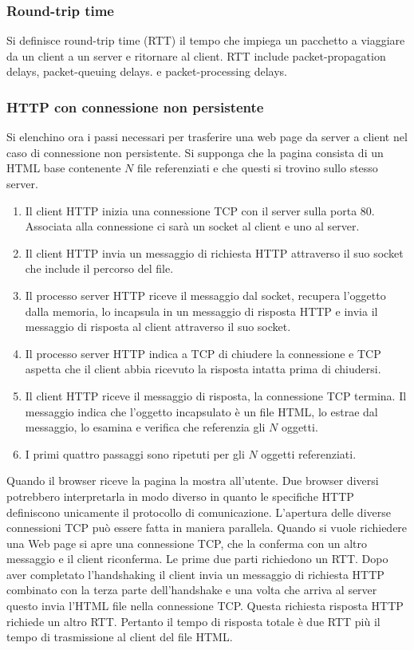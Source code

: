 \subsubsection{Round-trip time}
 Si definisce round-trip time (RTT) il tempo che impiega un pacchetto a viaggiare da un client a un server e ritornare al client. RTT include packet-propagation delays, packet-queuing delays. e packet-processing 
 delays. 
\subsubsection{HTTP con connessione non persistente}
Si elenchino ora i passi necessari per trasferire una web page da server a client nel caso di connessione non persistente. Si supponga che la pagina consista di un HTML base contenente $N$ file referenziati e 
che questi si trovino sullo stesso server.
\begin{enumerate}
\item Il client HTTP inizia una connessione TCP con il server sulla porta $80$. Associata alla connessione ci sar\`a un socket al client e uno al server.
\item Il client HTTP invia un messaggio di richiesta HTTP attraverso il suo socket che include il percorso del file.
\item Il processo server HTTP riceve il messaggio dal socket, recupera l'oggetto dalla memoria, lo incapsula in un messaggio di risposta HTTP e invia il messaggio di risposta al client attraverso il suo socket.
\item Il processo server HTTP indica a TCP di chiudere la connessione e TCP aspetta che il client abbia ricevuto la risposta intatta prima di chiudersi.
\item Il client HTTP riceve il messaggio di risposta, la connessione TCP termina. Il messaggio indica che l'oggetto incapsulato \`e un file HTML, lo estrae dal messaggio, lo esamina e verifica che referenzia gli
$N$ oggetti.
\item I primi quattro passaggi sono ripetuti per gli $N$ oggetti referenziati.
\end{enumerate}
Quando il browser riceve la pagina la mostra all'utente. Due browser diversi potrebbero interpretarla in modo diverso in quanto le specifiche HTTP definiscono unicamente il protocollo di comunicazione. 
L'apertura delle diverse connessioni TCP pu\`o essere fatta in maniera parallela. Quando si vuole richiedere una Web page si apre una connessione TCP, che la conferma con un altro messaggio e il client 
riconferma. Le prime due parti richiedono un RTT. Dopo aver completato l'handshaking il client invia un messaggio di richiesta HTTP combinato con la terza parte dell'handshake e una volta che arriva al server
questo invia l'HTML file nella connessione TCP. Questa richiesta risposta HTTP richiede un altro RTT. Pertanto il tempo di risposta totale \`e due RTT pi\`u il tempo di trasmissione al client del file HTML.
